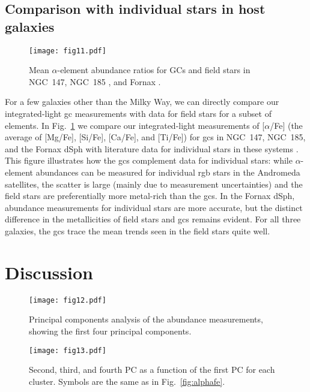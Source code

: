 \documentclass{aa}
\begin{document}
\subsection{Comparison with individual stars in host galaxies}
\label{sec:icmp}

\begin{figure}
\centering
\texttt{[image: fig11.pdf]}
\caption{\label{fig:alphacmp}Mean $\alpha$-element abundance ratios for GCs and field stars in NGC~147, NGC~185 \citep{Vargas2014}, and Fornax \citep{Letarte2010}.}
\end{figure}

For a few galaxies other than the Milky Way, we can directly compare our integrated-light \ac{gc} measurements with data for field stars for a subset of elements.  In Fig.~\ref{fig:alphacmp} we compare our integrated-light measurements of [$\alpha$/Fe] (the average of [Mg/Fe], [Si/Fe], [Ca/Fe], and [Ti/Fe]) for \acp{gc} in NGC~147, NGC~185, and the Fornax dSph with literature data for individual stars in these systems \citep{Letarte2010,Vargas2014}. This figure illustrates how the \acp{gc} complement data for individual stars: while $\alpha$-element abundances can be measured for individual \ac{rgb} stars in the Andromeda satellites, the scatter is large (mainly due to measurement uncertainties) and the field stars are preferentially more metal-rich than the \acp{gc}. In the Fornax dSph, abundance measurements for individual stars are more accurate, but the distinct difference in the metallicities of field stars and \acp{gc} remains evident. For all three galaxies, the \acp{gc} trace the mean trends seen in the field stars quite well.


\section{Discussion}
\label{sec:discussion}

\begin{figure}
\centering
\texttt{[image: fig12.pdf]}
\caption{\label{fig:pca}Principal components analysis of the abundance measurements, showing the first four principal components.}
\end{figure}

\begin{figure}
\centering
\texttt{[image: fig13.pdf]}
\caption{\label{fig:pc}Second, third, and fourth PC as a function of the first PC for each cluster. Symbols are the same as in Fig.~\ref{fig:alphafe}.}
\end{figure}
\end{document}
